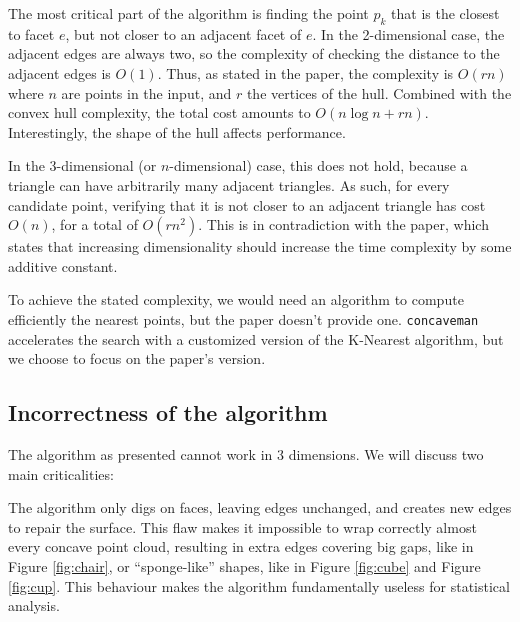\documentclass[a4paper]{article}
\newcommand{\ccvmn}{\lstinline{concaveman}}
\begin{document}
The most critical part of the algorithm is finding the point $p_k$ that is the closest to facet $e$, but not closer to an adjacent facet of $e$.
In the 2-dimensional case, the adjacent edges are always two, so the complexity of checking the distance to the adjacent edges is $O(1)$. Thus, as stated in the paper, the complexity is $O(rn)$ where $n$ are points in the input, and $r$ the vertices of the hull. Combined with the convex hull complexity, the total cost amounts to $O(n\log n+rn)$. Interestingly, the shape of the hull affects performance.

In the 3-dimensional (or $n$-dimensional) case, this does not hold, because a triangle can have arbitrarily many adjacent triangles. As such, for every candidate point, verifying that it is not closer to an adjacent triangle has cost $O(n)$, for a total of $O(rn^2)$. This is in contradiction with the paper, which states that increasing dimensionality should increase the time complexity by some additive constant.

To achieve the stated complexity, we would need an algorithm to compute efficiently the nearest points, but the paper doesn't provide one.
\ccvmn~ accelerates the search with a customized version of the K-Nearest algorithm, but we choose to focus on the paper's version.

\subsection{Incorrectness of the algorithm}\label{sub:incorrectness}

The algorithm as presented cannot work in 3 dimensions. We will discuss two main criticalities:

\bigskip

The algorithm only digs on faces, leaving edges unchanged, and creates new edges to repair the surface. This flaw makes it impossible to wrap correctly almost every concave point cloud, resulting in extra edges covering big gaps, like in Figure \ref{fig:chair}, or ``sponge-like'' shapes, like in Figure \ref{fig:cube} and Figure \ref{fig:cup}. This behaviour makes the algorithm fundamentally useless for statistical analysis.
\end{document}
